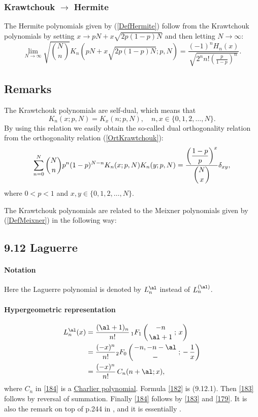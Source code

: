 \documentclass[envcountchap,graybox]{svmono}
\newcounter{rom}
\newcommand{\hyp}[5]{\mbox{}_{#1}{F}_{#2}
\left(\genfrac{}{}{0pt}{}{#3}{#4}\,;\,#5\right)}
\begin{document}
\subsubsection*{Krawtchouk $\rightarrow$ Hermite}
The Hermite polynomials given by (\ref{DefHermite}) follow from the Krawtchouk polynomials
by setting $x\rightarrow pN+x\sqrt{2p(1-p)N}$ and then letting $N\rightarrow\infty$:
\begin{equation}
\lim_{N\rightarrow\infty}
\sqrt{\binom{N}{n}}K_n(pN+x\sqrt{2p(1-p)N};p,N)
=\frac{\displaystyle (-1)^nH_n(x)}{\displaystyle\sqrt{2^nn!\left(\frac{p}{1-p}\right)^n}}.
\end{equation}

\subsection*{Remarks}
The Krawtchouk polynomials are self-dual, which means that
$$K_n(x;p,N)=K_x(n;p,N),\quad n,x\in\{0,1,2,\ldots,N\}.$$
By using this relation we easily obtain the so-called dual orthogonality
relation from the orthogonality relation (\ref{OrtKrawtchouk}):
$$\sum_{n=0}^N\binom{N}{n}p^n(1-p)^{N-n} K_n(x;p,N)K_n(y;p,N)=
\frac{\displaystyle\left(\frac{1-p}{p}\right)^x}{\dbinom{N}{x}}\delta_{xy},$$
where $0 < p < 1$ and $x,y\in\{0,1,2,\ldots,N\}$.

\noindent
The Krawtchouk polynomials are related to the Meixner polynomials given by (\ref{DefMeixner})
in the following way:
\subsection*{9.12 Laguerre}
\label{sec9.12}
\paragraph{Notation}
Here the Laguerre polynomial is denoted by $L_n^\al$ instead of
$L_n^{(\al)}$.
%
\paragraph{Hypergeometric representation}
\begin{align}
L_n^\al(x)&=
\frac{(\al+1)_n}{n!}\,\hyp11{-n}{\al+1}x
\label{182}\\
&=\frac{(-x)^n}{n!} \hyp20{-n,-n-\al}-{-\,\frac1x}
\label{183}\\
&=\frac{(-x)^n}{n!}\,C_n(n+\al;x),
\label{184}
\end{align}
where $C_n$ in \eqref{184} is a
\hyperref[sec9.14]{Charlier polynomial}.
Formula \eqref{182} is (9.12.1). Then \eqref{183} follows by reversal
of summation. Finally \eqref{184} follows by \eqref{183} and \eqref{179}.
It is also the remark on top of p.244 in , and it is essentially
.
%
\end{document}
